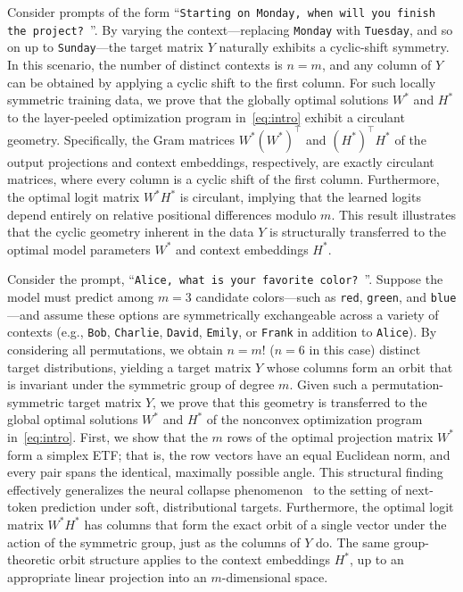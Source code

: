 \documentclass[11pt]{article}
\begin{document}
\vspace{0.5em}
Consider prompts of the form ``\texttt{Starting on Monday, when will you finish the project? \textvisiblespace}''. By varying the context---replacing \texttt{Monday} with \texttt{Tuesday}, and so on up to \texttt{Sunday}---the target matrix $Y$ naturally exhibits a cyclic-shift symmetry. In this scenario, the number of distinct contexts is $n = m$, and any column of $Y$ can be obtained by applying a cyclic shift to the first column. For such locally symmetric training data, we prove that the globally optimal solutions $W^*$ and $H^*$ to the layer-peeled optimization program in~\cref{eq:intro} exhibit a circulant geometry. Specifically, the Gram matrices \(W^*(W^*)^\top\) and \((H^*)^\top H^*\) of the output projections and context embeddings, respectively, are exactly circulant matrices, where every column is a cyclic shift of the first column. Furthermore, the optimal logit matrix \(W^*H^*\) is circulant, implying that the learned logits depend entirely on relative positional differences modulo \(m\). This result illustrates that the cyclic geometry inherent in the data $Y$ is structurally transferred to the optimal model parameters $W^*$ and context embeddings $H^*$.

\vspace{0.5em}
Consider the prompt, ``\texttt{Alice, what is your favorite color? \textvisiblespace}''. Suppose the model must predict among $m = 3$ candidate colors---such as \texttt{red}, \texttt{green}, and \texttt{blue}---and assume these options are symmetrically exchangeable across a variety of contexts (e.g., \texttt{Bob}, \texttt{Charlie}, \texttt{David}, \texttt{Emily}, or \texttt{Frank} in addition to \texttt{Alice}). By considering all permutations, we obtain $n = m!$ ($n = 6$ in this case) distinct target distributions, yielding a target matrix $Y$ whose columns form an orbit that is invariant under the symmetric group of degree $m$. Given such a permutation-symmetric target matrix $Y$, we prove that this geometry is transferred to the global optimal solutions $W^*$ and $H^*$ of the nonconvex optimization program in~\cref{eq:intro}. First, we show that the $m$ rows of the optimal projection matrix $W^*$ form a simplex ETF; that is, the row vectors have an equal Euclidean norm, and every pair spans the identical, maximally possible angle. This structural finding effectively generalizes the neural collapse phenomenon~\citep{papyan2020prevalence} to the setting of next-token prediction under soft, distributional targets. Furthermore, the optimal logit matrix $W^* H^*$ has columns that form the exact orbit of a single vector under the action of the symmetric group, just as the columns of $Y$ do. The same group-theoretic orbit structure applies to the context embeddings $H^*$, up to an appropriate linear projection into an $m$-dimensional space.
\end{document}

